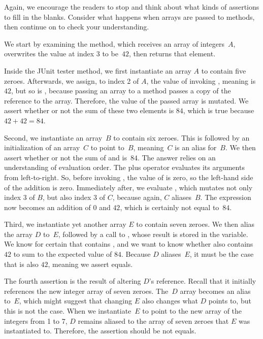 Again, we encourage the readers to stop and think about what kinds of assertions to fill in the blanks. Consider what happens when arrays are passed to methods, then continue on to check your understanding.

We start by examining the  method, which receives an array of integers~$A$, overwrites the value at index $3$ to be~$42$, then returns that element. 

Inside the JUnit tester method, we first instantiate an array $A$ to contain five zeroes. Afterwards, we assign, to index 2 of $A$, the value of invoking , meaning  is $42$, but so is , because passing an array to a method passes a copy of the reference to the array. Therefore, the value of the passed array is mutated. We assert whether or not the sum of these two elements is $84$, which is true because $42+42=84$.

Second, we instantiate an array~$B$ to contain six zeroes. This is followed by an initialization of an array~$C$ to point to~$B$, meaning~$C$ is an alias for~$B$. We then assert whether or not the sum of  and  is~$84$. The answer relies on an understanding of evaluation order. The plus operator evaluates its arguments from left-to-right. So, before invoking , the value of  is zero, so the left-hand side of the addition is zero. Immediately after, we evaluate , which mutates not only index $3$ of $B$, but also index $3$ of $C$, because again, $C$ aliases~$B$. The expression now becomes an addition of $0$ and $42$, which is certainly not equal to~$84$.

Third, we instantiate yet another array $E$ to contain seven zeroes. We then alias the array $D$ to~$E$, followed by a call to , whose result is stored in the  variable. We know for certain that  contains , and we want to know whether  also contains $42$ to sum to the expected value of $84$. Because $D$ aliases~$E$, it must be the case that  is also $42$, meaning we assert equals.

The fourth assertion is the result of altering $D$'s reference. Recall that it initially references the new integer array of seven zeroes. The~$D$ array becomes an alias to~$E$, which might suggest that changing $E$ also changes what $D$ points to, but this is not the case. When we instantiate~$E$ to point to the new array of the integers from 1 to 7, $D$ remains aliased to the array of seven zeroes that $E$ was instantiated to. Therefore, the assertion should be not equals.

